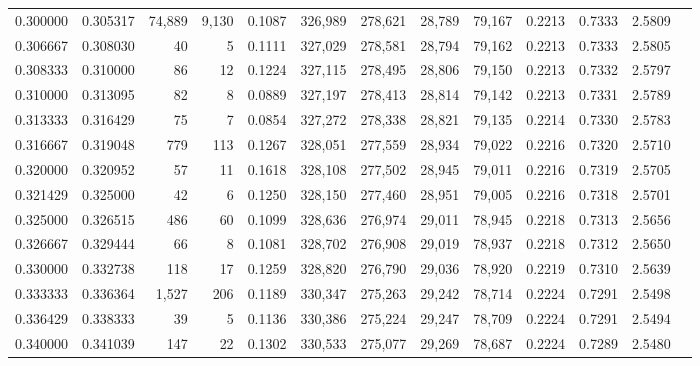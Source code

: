 \begin{tabular}{rrrrrrrrrrrrr}
0.300000 & 0.305317 & 74,889 &  9,130 &                                     0.1087 & 326,989 & 278,621 &  28,789 &  79,167 & 0.2213 & 0.7333 & 2.5809 \\
0.306667 & 0.308030 &     40 &      5 &                                     0.1111 & 327,029 & 278,581 &  28,794 &  79,162 & 0.2213 & 0.7333 & 2.5805 \\
0.308333 & 0.310000 &     86 &     12 &                                     0.1224 & 327,115 & 278,495 &  28,806 &  79,150 & 0.2213 & 0.7332 & 2.5797 \\
0.310000 & 0.313095 &     82 &      8 &                                     0.0889 & 327,197 & 278,413 &  28,814 &  79,142 & 0.2213 & 0.7331 & 2.5789 \\
0.313333 & 0.316429 &     75 &      7 &                                     0.0854 & 327,272 & 278,338 &  28,821 &  79,135 & 0.2214 & 0.7330 & 2.5783 \\
0.316667 & 0.319048 &    779 &    113 &                                     0.1267 & 328,051 & 277,559 &  28,934 &  79,022 & 0.2216 & 0.7320 & 2.5710 \\
0.320000 & 0.320952 &     57 &     11 &                                     0.1618 & 328,108 & 277,502 &  28,945 &  79,011 & 0.2216 & 0.7319 & 2.5705 \\
0.321429 & 0.325000 &     42 &      6 &                                     0.1250 & 328,150 & 277,460 &  28,951 &  79,005 & 0.2216 & 0.7318 & 2.5701 \\
0.325000 & 0.326515 &    486 &     60 &                                     0.1099 & 328,636 & 276,974 &  29,011 &  78,945 & 0.2218 & 0.7313 & 2.5656 \\
0.326667 & 0.329444 &     66 &      8 &                                     0.1081 & 328,702 & 276,908 &  29,019 &  78,937 & 0.2218 & 0.7312 & 2.5650 \\
0.330000 & 0.332738 &    118 &     17 &                                     0.1259 & 328,820 & 276,790 &  29,036 &  78,920 & 0.2219 & 0.7310 & 2.5639 \\
0.333333 & 0.336364 &  1,527 &    206 &                                     0.1189 & 330,347 & 275,263 &  29,242 &  78,714 & 0.2224 & 0.7291 & 2.5498 \\
0.336429 & 0.338333 &     39 &      5 &                                     0.1136 & 330,386 & 275,224 &  29,247 &  78,709 & 0.2224 & 0.7291 & 2.5494 \\
0.340000 & 0.341039 &    147 &     22 &                                     0.1302 & 330,533 & 275,077 &  29,269 &  78,687 & 0.2224 & 0.7289 & 2.5480 \\

\end{tabular}
